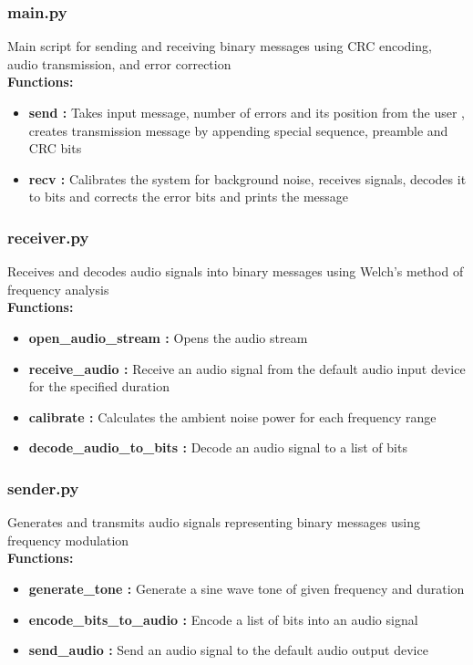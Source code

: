 \documentclass[11pt]{article}
\begin{document}
\subsubsection*{main.py}
Main script for sending and receiving binary messages using CRC encoding, audio transmission, and error correction\\
\textbf{Functions:}\vspace{-0.25cm}
\begin{itemize}\setlength\itemsep{-0.1cm}
    \item \textbf{send :} Takes input message, number of errors and its position from the user , creates transmission message by appending special sequence, preamble and CRC bits
    \item \textbf{recv :} Calibrates the system for background noise, receives signals, decodes it to bits and corrects the error bits and prints the message
\end{itemize}
\subsubsection*{receiver.py}
Receives and decodes audio signals into binary messages using Welch's method of frequency analysis\\
\textbf{Functions:}\vspace{-0.25cm}
\begin{itemize}\setlength\itemsep{-0.1cm}
    \item \textbf{open\_audio\_stream :} Opens the audio stream
    \item \textbf{receive\_audio :} Receive an audio signal from the default audio input device for the specified duration
    \item \textbf{calibrate :} Calculates the ambient noise power for each frequency range
    \item \textbf{decode\_audio\_to\_bits :} Decode an audio signal to a list of bits
\end{itemize}
\subsubsection*{sender.py}
Generates and transmits audio signals representing binary messages using frequency modulation\\
\textbf{Functions:}\vspace{-0.25cm}
\begin{itemize}\setlength\itemsep{-0.1cm}
    \item \textbf{generate\_tone :} Generate a sine wave tone of given frequency and duration
    \item \textbf{encode\_bits\_to\_audio :} Encode a list of bits into an audio signal
    \item \textbf{send\_audio :} Send an audio signal to the default audio output device
\end{itemize}
\end{document}
